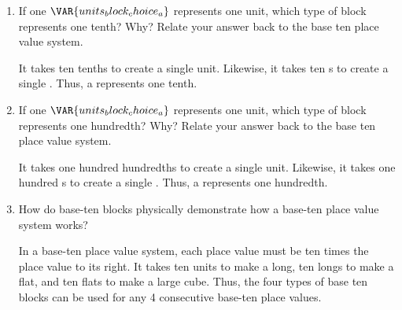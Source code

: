 \begin{enumerate}
    \item If one $\VAR{units_block_choice_a}$ represents one unit, which type of block represents one tenth? Why? Relate your answer back to the base ten place value system.

    \vspace{20pt}
    \begin{ansenv}
        It takes ten tenths to create a single unit. Likewise, it takes ten s to create a single . Thus, a  represents one tenth.
    \end{ansenv}
    \vfill

    \item If one $\VAR{units_block_choice_a}$ represents one unit, which type of block represents one hundredth? Why? Relate your answer back to the base ten place value system.

    \vspace{20pt}
    \begin{ansenv}
        It takes one hundred hundredths to create a single unit. Likewise, it takes one hundred s to create a single . Thus, a  represents one hundredth. 
    \end{ansenv}
    \vfill

    \item How do base-ten blocks physically demonstrate how a base-ten place value system works?

    \vspace{20pt}
    \begin{ansenv}
        In a base-ten place value system, each place value must be ten times the place value to its right. It takes ten units to make a long, ten longs to make a flat, and ten flats to make a large cube. Thus, the four types of base ten blocks can be used for any 4 consecutive base-ten place values.
    \end{ansenv}
    \vfill

\end{enumerate}
